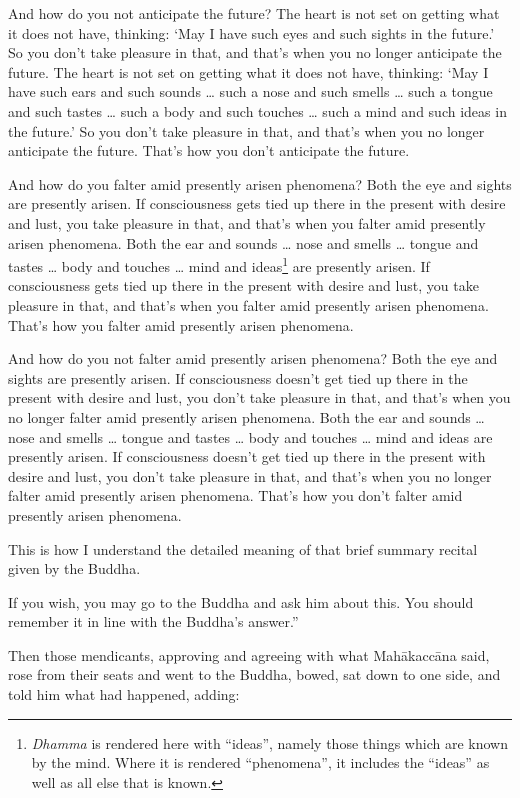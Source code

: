 \documentclass[12pt,openany]{book}%
\begin{document}
And how do you not anticipate the future? The heart is not set on getting what it does not have, thinking: ‘May I have such eyes and such sights in the future.’ So you don’t take pleasure in that, and that’s when you no longer anticipate the future. The heart is not set on getting what it does not have, thinking: ‘May I have such ears and such sounds … such a nose and such smells … such a tongue and such tastes … such a body and such touches … such a mind and such ideas in the future.’ So you don’t take pleasure in that, and that’s when you no longer anticipate the future. That’s how you don’t anticipate the future. 

And how do you falter amid presently arisen phenomena? Both the eye and sights are presently arisen. If consciousness gets tied up there in the present with desire and lust, you take pleasure in that, and that’s when you falter amid presently arisen phenomena. Both the ear and sounds … nose and smells … tongue and tastes … body and touches … mind and ideas\footnote{\textit{Dhamma} is rendered here with “ideas”, namely those things which are known by the mind. Where it is rendered “phenomena”, it includes the “ideas” as well as all else that is known. } are presently arisen. If consciousness gets tied up there in the present with desire and lust, you take pleasure in that, and that’s when you falter amid presently arisen phenomena. That’s how you falter amid presently arisen phenomena. 

And how do you not falter amid presently arisen phenomena? Both the eye and sights are presently arisen. If consciousness doesn’t get tied up there in the present with desire and lust, you don’t take pleasure in that, and that’s when you no longer falter amid presently arisen phenomena. Both the ear and sounds … nose and smells … tongue and tastes … body and touches … mind and ideas are presently arisen. If consciousness doesn’t get tied up there in the present with desire and lust, you don’t take pleasure in that, and that’s when you no longer falter amid presently arisen phenomena. That’s how you don’t falter amid presently arisen phenomena. 

This is how I understand the detailed meaning of that brief summary recital given by the Buddha. 

If you wish, you may go to the Buddha and ask him about this. You should remember it in line with the Buddha’s answer.” 

Then those mendicants, approving and agreeing with what \textsanskrit{Mahākaccāna} said, rose from their seats and went to the Buddha, bowed, sat down to one side, and told him what had happened, adding: 
\end{document}
